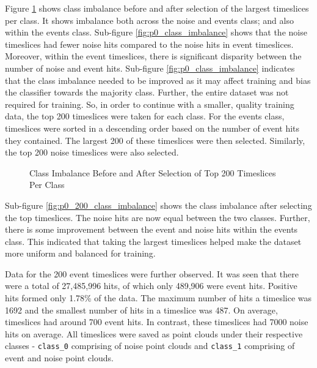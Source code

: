 Figure \ref{fig:p0_countplot_ci} shows class imbalance before and after selection of the largest timeslices per class. It shows imbalance both across the noise and events class; and also within the events class. Sub-figure \ref{fig:p0_class_imbalance} shows that the noise timeslices had fewer noise hits compared to the noise hits in event timeslices. Moreover, within the event timeslices, there is significant disparity between the number of noise and event hits. Sub-figure \ref{fig:p0_class_imbalance} indicates that the class imbalance needed to be improved as it may affect training and bias the classifier towards the majority class. Further, the entire dataset was not required for training. So, in order to continue with a smaller, quality training data, the top 200 timeslices were taken for each class. For the events class, timeslices were sorted in a descending order based on the number of event hits they contained. The largest 200 of these timeslices were then selected. Similarly, the top 200 noise timeslices were also selected. 

\begin{figure}[ht!]   
\centering
{}
\caption[]{Class Imbalance Before and After Selection of Top 200 Timeslices Per Class}
\label{fig:p0_countplot_ci}
\end{figure}

Sub-figure \ref{fig:p0_200_class_imbalance} shows the class imbalance after selecting the top timeslices. The noise hits are now equal between the two classes. Further, there is some improvement between the event and noise hits within the events class. This indicated that taking the largest timeslices helped make the dataset more uniform and balanced for training.

Data for the 200 event timeslices were further observed. It was seen that there were a total of 27,485,996 hits, of which only 489,906 were event hits. Positive hits formed only 1.78\% of the data. The maximum number of hits a timeslice was 1692 and the smallest number of hits in a timeslice was 487. On average, timeslices had around 700 event hits. In contrast, these timeslices had 7000 noise hits on average. All timeslices were saved as point clouds under their respective classes - \texttt{class\_0} comprising of noise point clouds and \texttt{class\_1} comprising of event and noise point clouds.


